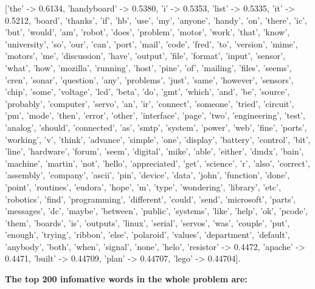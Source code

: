 \documentclass{article}
\begin{document}
['the' -> 0.6134, 'handyboard' -> 0.5380, 'i' -> 0.5353, 'list' -> 0.5335, 'it' -> 0.5212, 'board', 'thanks', 'if', 'hb', 'use', 'my', 'anyone', 'handy', 'on', 'there', 'ic', 'but', 'would', 'am', 'robot', 'does', 'problem', 'motor', 'work', 'that', 'know', 'university', 'so', 'our', 'can', 'port', 'mail', 'code', 'fred', 'to', 'version', 'mime', 'motors', 'me', 'discussion', 'have', 'output', 'file', 'format', 'input', 'sensor', 'what', 'how', 'mozilla', 'running', 'host', 'pine', 'of', 'mailing', 'files', 'seems', 'cren', 'sonar', 'question', 'any', 'problems', 'just', 'same', 'however', 'sensors', 'chip', 'some', 'voltage', 'lcd', 'beta', 'do', 'gmt', 'which', 'and', 'be', 'source', 'probably', 'computer', 'servo', 'an', 'ir', 'connect', 'someone', 'tried', 'circuit', 'pm', 'mode', 'then', 'error', 'other', 'interface', 'page', 'two', 'engineering', 'test', 'analog', 'should', 'connected', 'as', 'smtp', 'system', 'power', 'web', 'fine', 'ports', 'working', 'v', 'think', 'advance', 'simple', 'one', 'display', 'battery', 'control', 'bit', 'line', 'hardware', 'forum', 'seem', 'digital', 'mike', 'able', 'either', 'dmdx', 'bain', 'machine', 'martin', 'not', 'hello', 'appreciated', 'get', 'science', 'r', 'also', 'correct', 'assembly', 'company', 'ascii', 'pin', 'device', 'data', 'john', 'function', 'done', 'point', 'routines', 'eudora', 'hope', 'm', 'type', 'wondering', 'library', 'etc', 'robotics', 'find', 'programming', 'different', 'could', 'send', 'microsoft', 'parts', 'messages', 'dc', 'maybe', 'between', 'public', 'systems', 'like', 'help', 'ok', 'pcode', 'them', 'boards', 'is', 'outputs', 'linux', 'serial', 'servos', 'was', 'couple', 'put', 'enough', 'trying', 'ribbon', 'else', 'polaroid', 'values', 'department', 'default', 'anybody', 'both', 'when', 'signal', 'none', 'helo', 'resistor' -> 0.4472, 'apache' -> 0.4471, 'built' -> 0.44709, 'plan' -> 0.44707, 'lego' -> 0.44704].

\textbf{The top 200 infomative words in the whole problem are:}
\end{document}
